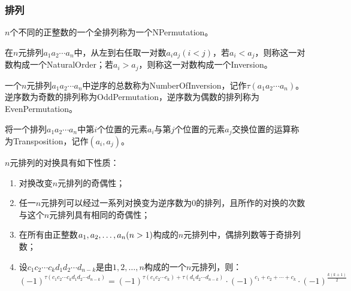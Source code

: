 \subsubsection{排列}
\begin{definition}
	$n$个不同的正整数的一个全排列称为一个\gls{NPermutation}。
\end{definition}
\begin{definition}
	在$n$元排列$a_1a_2\cdots a_n$中，从左到右任取一对数$a_ia_j(i<j)$，若$a_i<a_j$，则称这一对数构成一个\gls{NaturalOrder}；若$a_i>a_j$，则称这一对数构成一个\gls{Inversion}。
\end{definition}
\begin{definition}
	一个$n$元排列$a_1a_2\cdots a_n$中逆序的总数称为\gls{NumberOfInversion}，记作$\tau(a_1a_2\cdots a_n)$。逆序数为奇数的排列称为\gls{OddPermutation}，逆序数为偶数的排列称为\gls{EvenPermutation}。
\end{definition}
\begin{definition}
	将一个排列$a_1a_2\cdots a_n$中第$i$个位置的元素$a_i$与第$j$个位置的元素$a_j$交换位置的运算称为\gls{Transposition}，记作$(a_i,a_j)$。
\end{definition}
\begin{property}\label{prop:Transposition}
	$n$元排列的对换具有如下性质：
	\begin{enumerate}
		\item 对换改变$n$元排列的奇偶性；
		\item 任一$n$元排列可以经过一系列对换变为逆序数为$0$的排列，且所作的对换的次数与这个$n$元排列具有相同的奇偶性；
		\item 在所有由正整数$a_1, a_2, \dots, a_{n}(n>1)$构成的$n$元排列中，偶排列数等于奇排列数；
		\item 设$c_1c_2\cdots c_kd_1d_2\cdots d_{n-k}$是由$1,2,\dots,n$构成的一个$n$元排列，则：
		\begin{equation*}
			(-1)^{\tau(c_1c_2\cdots c_kd_1d_2\cdots d_{n-k})}=(-1)^{\tau(c_1c_2\cdots c_k)+\tau(d_1d_2\cdots d_{n-k})}\cdot(-1)^{c_1+c_2+\cdots+c_k}\cdot(-1)^{\frac{k(k+1)}{2}}
		\end{equation*}
	\end{enumerate}
\end{property}
